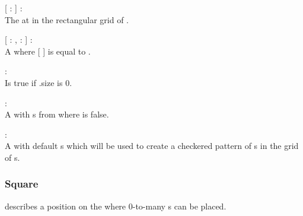 \begin{dlist}
  \item {}[  :  ] : \\
  The  at  in the rectangular grid of .
  
  \item {}[  : ,  :  ] : \\
  A  where [  ] is equal to .
  
  \item {} : \\
  Is true if .size is 0.
  
  \item {} : \\
  A  with s from  where  is false.
  
  \item {} : \\
  A  with default s which will be used to create a checkered pattern of s in the grid of s.
\end{dlist}

\subsubsection{Square}
 describes a position on the  where 0-to-many s can be placed.

